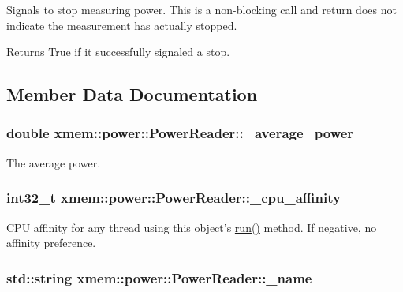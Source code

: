 Signals to stop measuring power. This is a non-\/blocking call and return does not indicate the measurement has actually stopped. 

\begin{DoxyReturn}{Returns}
True if it successfully signaled a stop. 
\end{DoxyReturn}


\subsection{Member Data Documentation}
\hypertarget{classxmem_1_1power_1_1_power_reader_a1ad637b79a21519c20f9dda64fc1b908}{
\subsubsection[{\-\_\-average\-\_\-power}]{\setlength{\rightskip}{0pt plus 5cm}double xmem\-::power\-::\-Power\-Reader\-::\-\_\-average\-\_\-power\hspace{0.3cm}{\ttfamily [protected]}}}\label{classxmem_1_1power_1_1_power_reader_a1ad637b79a21519c20f9dda64fc1b908}
The average power. \hypertarget{classxmem_1_1power_1_1_power_reader_a0f95e6c4e8caa6db8de3fcf78509e887}{
\subsubsection[{\-\_\-cpu\-\_\-affinity}]{\setlength{\rightskip}{0pt plus 5cm}int32\-\_\-t xmem\-::power\-::\-Power\-Reader\-::\-\_\-cpu\-\_\-affinity\hspace{0.3cm}{\ttfamily [protected]}}}\label{classxmem_1_1power_1_1_power_reader_a0f95e6c4e8caa6db8de3fcf78509e887}
C\-P\-U affinity for any thread using this object's \hyperlink{classxmem_1_1power_1_1_power_reader_ad8286b3727efbcb0ff5049c6594d126a}{run()} method. If negative, no affinity preference. \hypertarget{classxmem_1_1power_1_1_power_reader_a85791da354d03c0a0f7ca4cf38b89e4c}{
\subsubsection[{\-\_\-name}]{\setlength{\rightskip}{0pt plus 5cm}std\-::string xmem\-::power\-::\-Power\-Reader\-::\-\_\-name\hspace{0.3cm}{\ttfamily [protected]}}}\label{classxmem_1_1power_1_1_power_reader_a85791da354d03c0a0f7ca4cf38b89e4c}
